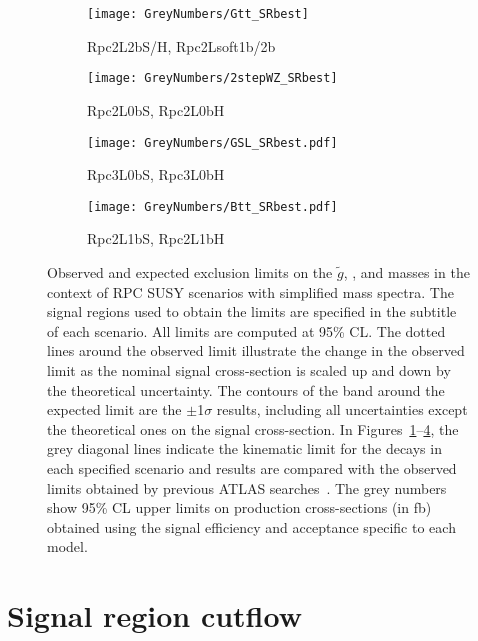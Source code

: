 \begin{figure}[p]
\centering
\begin{subfigure}[t]{0.49\textwidth}\texttt{[image: GreyNumbers/Gtt\_SRbest]}\caption{Rpc2L2bS/H, Rpc2Lsoft1b/2b}\label{fig:GN_limits_feynman_gtt}\end{subfigure}
\begin{subfigure}[t]{0.49\textwidth}\texttt{[image: GreyNumbers/2stepWZ\_SRbest]}\caption{Rpc2L0bS, Rpc2L0bH}\label{fig:GN_limits_feynman_gg2WZ}\end{subfigure}
\begin{subfigure}[t]{0.49\textwidth}\texttt{[image: GreyNumbers/GSL\_SRbest.pdf]}\caption{Rpc3L0bS, Rpc3L0bH}\label{fig:GN_limits_feynman_gg2sl}\end{subfigure}
\begin{subfigure}[t]{0.49\textwidth}\texttt{[image: GreyNumbers/Btt\_SRbest.pdf]}\caption{Rpc2L1bS, Rpc2L1bH}\label{fig:GN_limits_feynman_b1b1}\end{subfigure}

\caption{Observed and expected exclusion limits on the $\tilde{g}$, \sbottomone, \stopone and \ninoone masses 
in the context of RPC SUSY scenarios with simplified mass spectra. The signal regions used to obtain the limits are specified in the subtitle of each scenario. All limits are computed at 95\% CL. The dotted lines around the observed
limit illustrate the change in the observed limit as the nominal signal cross-section is scaled up and down
by the theoretical uncertainty. The contours of the band around the expected 
limit are the $\pm$1$\sigma$ results, 
including all uncertainties except the theoretical ones on the signal cross-section. In 
Figures~\ref{fig:GN_limits_feynman_gtt}--\ref{fig:GN_limits_feynman_b1b1}, the grey diagonal lines indicate the kinematic limit for the decays in each 
specified scenario and results are compared with the observed limits obtained by previous ATLAS searches~\cite{paperSS3L,Aad:2016jxj}. 
The grey numbers show 95\% CL upper limits on production cross-sections (in fb) obtained using the signal efficiency and acceptance specific to each model.}
\label{fig:Results_Limits_RPC_GN} 
\end{figure} 

\clearpage

\section{Signal region cutflow}
\label{app:aux.SRcut}

